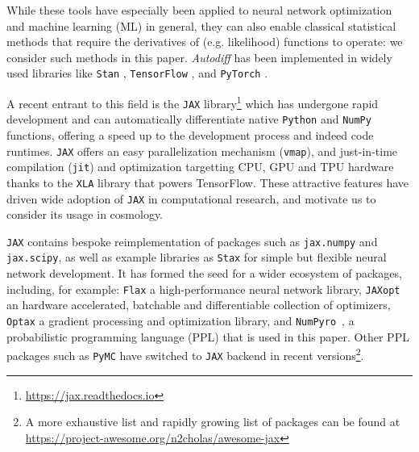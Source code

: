 \documentclass[twocolumn,twocolappendix,nofootinbib,iop]{openjournal}
\newcommand{\numpyro}{\texttt{NumPyro}}
\begin{document}
While these tools have especially been applied to neural network optimization and machine learning (ML) in general, they can also enable classical statistical methods that require the derivatives of (e.g. likelihood) functions to operate: we consider such methods in this paper. \textit{Autodiff} has been implemented in widely used libraries like \texttt{Stan} \citep{JSSv076i01}, \texttt{TensorFlow}  \citep{tensorflow2015-whitepaper}, and  \texttt{PyTorch} \citep{NEURIPS2019_9015}. 

A recent entrant to this field is the \texttt{JAX} library\footnote{\url{https://jax.readthedocs.io}} \citep{jax2018github} which has undergone rapid development and can automatically differentiate native \texttt{Python} and \texttt{NumPy} functions, offering a speed up to the development process and indeed code runtimes. \texttt{JAX} offers an easy parallelization mechanism (\texttt{vmap}), and just-in-time compilation (\texttt{jit}) and optimization targetting CPU, GPU and TPU hardware thanks to the \texttt{XLA} library that powers TensorFlow. These attractive features have driven wide adoption of \texttt{JAX} in computational research, and motivate us to consider its usage in cosmology.

\texttt{JAX} contains bespoke reimplementation of packages such as \texttt{jax.numpy} and \texttt{jax.scipy}, as well as example libraries as \texttt{Stax} for simple but flexible neural network development. It has formed the seed for a wider ecosystem of packages, including, for example: 
\texttt{Flax} \citep{flax2020github} a high-performance neural network library, \texttt{JAXopt} \citep{jaxopt_implicit_diff} an hardware accelerated, batchable and differentiable collection of optimizers, \texttt{Optax} \citep{optax2020github} a gradient processing and optimization library, and \numpyro\ \citep{phan2019composable,bingham2019pyro}, a probabilistic programming language (PPL) that is used in this paper. Other PPL packages such as \texttt{PyMC} \citep{Salvatier2016} have switched to \texttt{JAX} backend in recent versions\footnote{A more exhaustive list and rapidly growing list of packages can be found at \url{https://project-awesome.org/n2cholas/awesome-jax}}.

\end{document}
